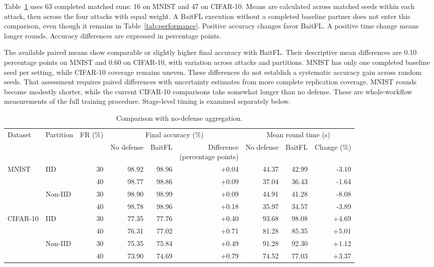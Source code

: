\documentclass[conference]{IEEEtran}
\begin{document}
Table~\ref{tab:baseline} uses 63 completed matched
runs: 16 on MNIST and
47 on CIFAR-10. Means are calculated across matched seeds within
each attack, then across the four attacks with equal weight. A BaitFL
execution without a completed baseline partner does not enter this
comparison, even though it remains in Table~\ref{tab:performance}.
Positive accuracy changes favor BaitFL. A positive time change means
longer rounds. Accuracy differences are expressed in percentage points.

The available paired means show comparable or slightly higher final
accuracy with BaitFL. Their descriptive mean differences are
0.10 percentage points on MNIST and 0.60
on CIFAR-10, with variation across attacks and partitions. MNIST has only
one completed baseline seed per setting, while CIFAR-10 coverage remains
uneven. These differences do not establish a systematic accuracy gain
across random seeds. That assessment requires paired differences with
uncertainty estimates from more complete replication coverage.
MNIST rounds become modestly shorter, while the current CIFAR-10
comparisons take somewhat longer than no defense. These are whole-workflow
measurements of the full training procedure. Stage-level timing is
examined separately below.

\begin{table}[t]\centering\footnotesize\setlength{\tabcolsep}{5pt}
\caption{Comparison with no-defense aggregation.}\label{tab:baseline}
\begin{tabular}{llrrrrrrr}\toprule
\multirow{2}{*}{Dataset} & \multirow{2}{*}{Partition} & \multirow{2}{*}{FR (\%)} & \multicolumn{3}{c}{Final accuracy (\%)} & \multicolumn{3}{c}{Mean round time (s)} \\
\cmidrule(lr){4-6}\cmidrule(lr){7-9}
& & & No defense & BaitFL & \shortstack{Difference\\(percentage points)} & No defense & BaitFL & Change (\%) \\ \midrule
\multirow{4}{*}{MNIST} & \multirow{2}{*}{IID} & 30 & 98.92 & 98.96 & +0.04 & 44.37 & 42.99 & -3.10 \\
 &  & 40 & 98.77 & 98.86 & +0.09 & 37.04 & 36.43 & -1.64 \\
\cmidrule(lr){2-9}
 & \multirow{2}{*}{Non-IID} & 30 & 98.90 & 98.99 & +0.09 & 44.91 & 41.28 & -8.08 \\
 &  & 40 & 98.78 & 98.96 & +0.18 & 35.97 & 34.57 & -3.89 \\
\midrule
\multirow{4}{*}{CIFAR-10} & \multirow{2}{*}{IID} & 30 & 77.35 & 77.76 & +0.40 & 93.68 & 98.08 & +4.69 \\
 &  & 40 & 76.31 & 77.02 & +0.71 & 81.28 & 85.35 & +5.01 \\
\cmidrule(lr){2-9}
 & \multirow{2}{*}{Non-IID} & 30 & 75.35 & 75.84 & +0.49 & 91.28 & 92.30 & +1.12 \\
 &  & 40 & 73.90 & 74.69 & +0.79 & 74.52 & 77.03 & +3.37 \\
\bottomrule\end{tabular}\end{table}
\end{document}
